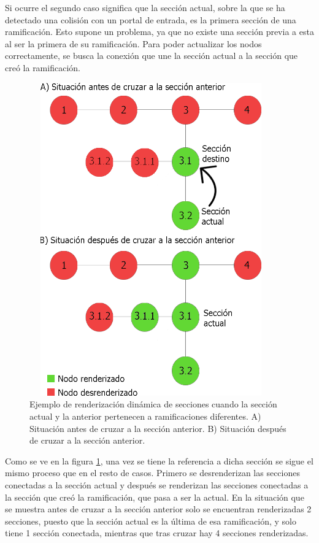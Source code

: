 \documentclass[../main.tex]{subfiles}
\begin{document}
Si ocurre el segundo caso significa que la sección actual, sobre la que se ha detectado una colisión con un portal de entrada, es la primera sección de una ramificación. Esto supone un problema, ya que no existe una sección previa a esta al ser la primera de su ramificación. Para poder actualizar los nodos correctamente, se busca la conexión que une la sección actual a la sección que creó la ramificación. 

\begin{figure}[h!]
\centering
\includegraphics[width=10.5cm,height=13.5cm]{imagenes/Entry_Portal_Render.png}
\caption{Ejemplo de renderización dinámica de secciones cuando la sección actual y la anterior pertenecen a ramificaciones diferentes. A) Situación antes de cruzar a la sección anterior. B) Situación después de cruzar a la sección anterior.}
\label{fig:Entry_Portal_Render_Case}
\end{figure}

Como se ve en la figura \ref{fig:Entry_Portal_Render_Case}, una vez se tiene la referencia a dicha sección se sigue el mismo proceso que en el resto de casos. Primero se desrenderizan las secciones conectadas a la sección actual y después se renderizan las secciones conectadas a la sección que creó la ramificación, que pasa a ser la actual. En la situación que se muestra antes de cruzar a la sección anterior solo se encuentran renderizadas 2 secciones, puesto que la sección actual es la última de esa ramificación, y solo tiene 1 sección conectada, mientras que tras cruzar hay 4 secciones renderizadas.
\end{document}
